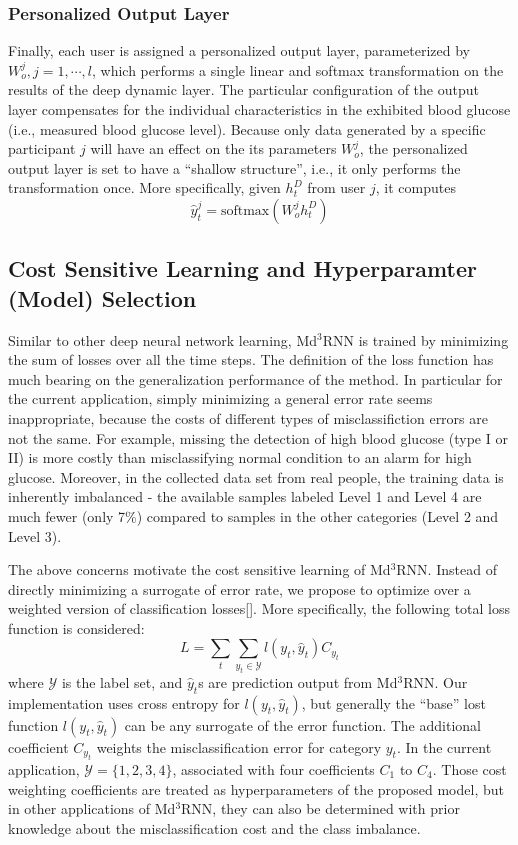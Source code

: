 \subsubsection{Personalized Output Layer}
Finally, each user is assigned a personalized output layer, parameterized by $W_o^j, j=1,\cdots,l$, which performs a single linear and softmax transformation on the results of the deep dynamic layer. The particular configuration of the output layer compensates for the individual characteristics in the exhibited blood glucose (i.e., measured blood glucose level). Because only data generated by a specific participant $j$ will have an effect on the its parameters $W_o^j$, the personalized output layer is set to have a ``shallow structure'', i.e., it only performs the transformation once. More specifically, given $h^D_t$ from user $j$, it computes
\begin{equation}
\hat{y}_t^j = \text{softmax} \left( W_o^j h^D_t \right)
\end{equation}

\subsection{Cost Sensitive Learning and Hyperparamter (Model) Selection}

Similar to other deep neural network learning, Md$^3$RNN is trained by minimizing the sum of losses over all the time steps. The definition of the loss function has much bearing on the generalization performance of the method. In particular for the current application, simply minimizing a general error rate seems inappropriate, because the costs of different types of misclassifiction errors are not the same. For example, missing the detection of high blood glucose (type I or II) is more costly than misclassifying normal condition to an alarm for high glucose. Moreover, in the collected data set from real people, the training data is inherently imbalanced - the available samples labeled Level 1 and Level 4 are much fewer (only 7\%) compared to samples in the other categories (Level 2 and Level 3). 

The above concerns motivate the cost sensitive learning of Md$^3$RNN. Instead of directly minimizing a surrogate of error rate, we propose to optimize over a weighted version of classification losses[]. More specifically, the following total loss function is considered:
\begin{equation}
L = \sum_{t} \sum_{y_t \in \mathcal{Y}} l(y_t,\hat{y}_t)C_{y_t}
\end{equation} 
where $\mathcal{Y}$ is the label set, and $\hat{y}_t$s are prediction output from Md$^3$RNN. Our implementation uses cross entropy for $l(y_t,\hat{y}_t)$, but generally the ``base'' lost function $l(y_t,\hat{y}_t)$ can be any surrogate of the error function. The additional coefficient $C_{y_t}$ weights the misclassification error for category $y_t$. In the current application, $\mathcal{Y} = \{1,2,3,4\}$, associated with four coefficients $C_1$ to $C_4$. Those cost weighting coefficients are treated as hyperparameters of the proposed model, but in other applications of Md$^3$RNN, they can also be determined with prior knowledge about the misclassification cost and the class imbalance. 

